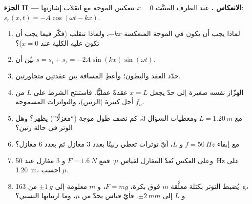 \begin{problem}
\medskip
\noindent\textbf{الجزء II --- الانعكاس .}
عند الطرف المثبَّت $x = 0$ تنعكس الموجة مع انقلاب إشارتها:
$s_r(x, t) = -A\cos(\omega t - kx)$.
\begin{enumerate}[resume]
  \item لماذا يجب أن يكون في  الموجة المنعكسة $-kx$، ولماذا
        تنقلب  (فكّر فيما يجب أن تكون عليه  الكلية
        عند $x = 0$)؟
  \item بيّن أن $s = s_i + s_r = -2A\sin(kx)\sin(\omega t)$.
  \item حدّد العقد والبطون؛ وأعطِ المسافة بين عقدتين
        متجاورتين.
  \item {} الهزّاز نفسه صغيرة إلى حدّ يجعل $x = L$
        عقدةً عمليًّا. فاستنتج الشرط على $L$ من أجل  كبيرة (الرنين)، والتواترات المسموحة $f_n$.
  \item مع $L = \qty{1.20}{m}$ ومعطيات السؤال 3، كم
        نصف طول موجة (``مغزلًا'') يظهر؟ وهل الوتر
        في حالة رنين؟
  \item مع إبقاء $f = \qty{50}{Hz}$ و $L$، أيّ توترات تعطي
        رنينًا بعدد $3$ مغازل ثم بعدد $6$ مغازل؟
  \item وعلى العكس تُعدّ المغازل لقياس $\mu$: فمع
        $F = \qty{1.6}{N}$ و $3$ مغازل عند \qty{50}{Hz} على \qty{1.20}{m}،
        احسب $\mu$.
  \item يُضبط التوتر بكتلة معلَّقة $m$ فوق بكرة،
        $F = mg$، و $m$ معلومة إلى $\pm\qty{1}{g}$ من \qty{163}{g}، و
        $L$ إلى $\pm\qty{2}{mm}$. فأيّ قياس يحدّ من $\mu$، وما
        ارتيابها النسبي؟
\end{enumerate}


\end{problem}
